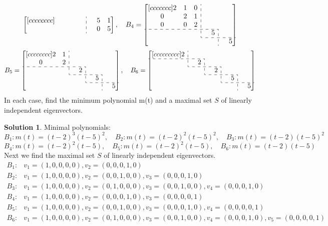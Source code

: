 \documentclass[12pt]{article}
\newcommand*{\tempb}{\multicolumn{1}{:c}{}} %
\theoremstyle{definition}
\newtheorem*{solution}{Solution} %
\theoremstyle{plain}
\begin{document}
\begin{enumerate}
\[\begin{bmatrix}[cccccccc]
{}&{}&{}&{}&{}&\tempb&5&1\\
{}&{}&{}&{}&{}&\tempb&0&5\\\end{bmatrix}
,\quad
B_4=\begin{bmatrix}[ccccccc]
2&1&0&\tempb&{}&{}&{}\\
0&2&1&\tempb&{}&{}&{}\\
0&0&2&\tempb&{}&{}&{}\\
\cdashline{1-5}
{}&{}&{}&\tempb&5&\tempb&{}\\
\cdashline{4-7}
{}&{}&{}&{}&{}&\tempb&5\\\end{bmatrix}\]
\[ B_5=\begin{bmatrix}[cccccccc]
2&1&\tempb&{}&{}&{}&{}&{}\\
0&2&\tempb&{}&{}&{}&{}&{}\\
\cdashline{1-4}
{}&{}&\tempb&2&\tempb&{}&{}&{}\\
\cdashline{3-6}
{}&{}&{}&{}&\tempb&5&\tempb&{}\\
\cdashline{5-8}
{}&{}&{}&{}&{}&{}&\tempb&5\\\end{bmatrix}
,\quad
B_6=\begin{bmatrix}[ccccccccc]
2&\tempb&{}&{}&{}&{}&{}&{}&{}\\
\cdashline{1-3}
{}&\tempb&2&\tempb&{}&{}&{}&{}&{}\\
\cdashline{2-5}
{}&{}&{}&\tempb&2&\tempb&{}&{}&{}\\
\cdashline{4-7}
{}&{}&{}&{}&{}&\tempb&5&\tempb&{}\\
\cdashline{6-9}
{}&{}&{}&{}&{}&{}&{}&\tempb&5\\\end{bmatrix} \]
In each case, find the minimum polynomial m(t) and a maximal set $S$ of linearly independent eigenvectors.
	\begin{solution} Minimal polynomials:
	\[ B_1:m(t)=(t-2)^3(t-5)^2,\quad B_2:m(t)=(t-2)^2(t-5)^2,\quad B_3:m(t)=(t-2)(t-5)^2 \]
	\[ B_4:m(t)=(t-2)^2(t-5),\quad B_5:m(t)=(t-2)^2(t-5),\quad B_6:m(t)=(t-2)(t-5) \]
	Next we find the maximal set $S$ of linearly independent eigenvectors.
	\begin{align*}
	B_1:& v_1=(1,0,0,0,0),v_2=(0,0,0,1,0)\\
	B_2:& v_1=(1,0,0,0,0),v_2=(0,0,1,0,0),v_3=(0,0,0,1,0)\\
	B_3:& v_1=(1,0,0,0,0),v_2=(0,1,0,0,0),v_3=(0,0,1,0,0),v_4=(0,0,0,1,0)\\
	B_4:& v_1=(1,0,0,0,0),v_2=(0,0,0,1,0),v_3=(0,0,0,0,1)\\
	B_5:& v_1=(1,0,0,0,0),v_2=(0,0,1,0,0),v_3=(0,0,0,1,0),v_4=(0,0,0,0,1)\\
	B_6:& v_1=(1,0,0,0,0),v_2=(0,1,0,0,0),v_3=(0,0,1,0,0),v_4=(0,0,0,1,0),v_5=(0,0,0,0,1)
	\end{align*}
	\end{solution}
	

\end{enumerate}
\end{document}
